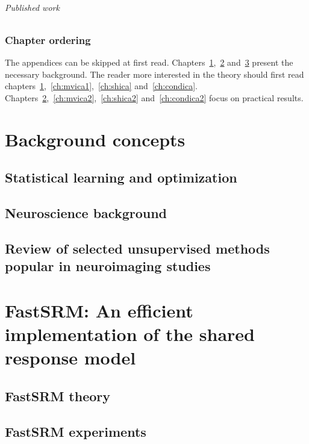 \documentclass[ twoside,openright,titlepage,numbers=noenddot,%
                headinclude,footinclude,cleardoublepage=empty,abstract=on,
                BCOR=5mm,paper=a4,fontsize=11pt, 
                ]{scrreprt}
\begin{document}
\paragraph{Published work}



\section{Chapter ordering}
The appendices can be skipped at first read.
Chapters~\ref{ch:statistical_learning},~\ref{ch:neuroscience} and~\ref{ch:review} present the necessary background.
The reader more interested in the
theory should first read
chapters~\ref{ch:fastsrm1},~\ref{ch:mvica1},~\ref{ch:shica}
and~\ref{ch:condica}. Chapters~\ref{ch:fastsrm2},~\ref{ch:mvica2},~\ref{ch:shica2}
and~\ref{ch:condica2} focus on practical results.







\part{Background concepts}
\label{part:background}
\chapter{Statistical learning and optimization}
\label{ch:statistical_learning}

\chapter{Neuroscience background}
\label{ch:neuroscience}

\chapter{Review of selected unsupervised methods popular in neuroimaging studies}
\label{ch:review}

\part{FastSRM: An efficient implementation of the shared response model}
\label{part:fastsrm}
\chapter{FastSRM theory}
\label{ch:fastsrm1}

\chapter{FastSRM experiments}
\label{ch:fastsrm2}

\end{document}
